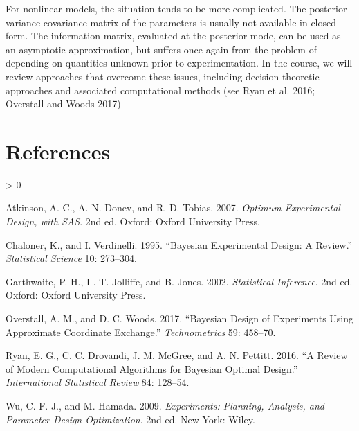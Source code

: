 \documentclass[
]{article}
\newlength{\cslhangindent}
\newenvironment{CSLReferences}[2] %
 {%
  \setlength{\parindent}{0pt}
  \ifodd #1 \everypar{\setlength{\hangindent}{\cslhangindent}}\ignorespaces\fi
  \ifnum #2 > 0
  \setlength{\parskip}{#2\baselineskip}
  \fi
 }%
 {}
\begin{document}
For nonlinear models, the situation tends to be more complicated. The
posterior variance covariance matrix of the parameters is usually not
available in closed form. The information matrix, evaluated at the
posterior mode, can be used as an asymptotic approximation, but suffers
once again from the problem of depending on quantities unknown prior to
experimentation. In the course, we will review approaches that overcome
these issues, including decision-theoretic approaches and associated
computational methods (see Ryan et al. 2016; Overstall and Woods 2017)

\hypertarget{references}{%
\section*{References}\label{references}}

\hypertarget{refs}{}
\begin{CSLReferences}{1}{0}
\leavevmode\hypertarget{ref-ADT2007}{}%
Atkinson, A. C., A. N. Donev, and R. D. Tobias. 2007. \emph{Optimum
Experimental Design, with SAS}. 2nd ed. Oxford: Oxford University Press.

\leavevmode\hypertarget{ref-CV1995}{}%
Chaloner, K., and I. Verdinelli. 1995. {``Bayesian Experimental Design:
A Review.''} \emph{Statistical Science} 10: 273--304.

\leavevmode\hypertarget{ref-GJJ2002}{}%
Garthwaite, P. H., I . T. Jolliffe, and B. Jones. 2002.
\emph{Statistical Inference}. 2nd ed. Oxford: Oxford University Press.

\leavevmode\hypertarget{ref-OW2017}{}%
Overstall, A. M., and D. C. Woods. 2017. {``Bayesian Design of
Experiments Using Approximate Coordinate Exchange.''}
\emph{Technometrics} 59: 458--70.

\leavevmode\hypertarget{ref-RDMP2016}{}%
Ryan, E. G., C. C. Drovandi, J. M. McGree, and A. N. Pettitt. 2016. {``A
Review of Modern Computational Algorithms for {B}ayesian Optimal
Design.''} \emph{International Statistical Review} 84: 128--54.

\leavevmode\hypertarget{ref-WH2009}{}%
Wu, C. F. J., and M. Hamada. 2009. \emph{Experiments: Planning,
Analysis, and Parameter Design Optimization}. 2nd ed. New York: Wiley.

\end{CSLReferences}
\end{document}
